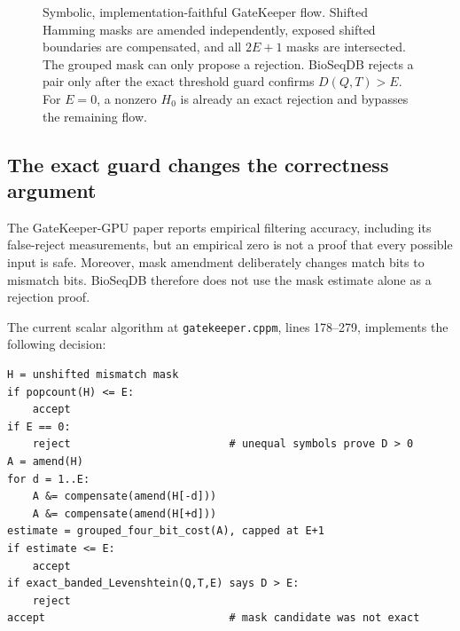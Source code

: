 \begin{figure}[htbp]
\caption{Symbolic, implementation-faithful GateKeeper flow.  Shifted Hamming
masks are amended independently, exposed shifted boundaries are compensated,
and all \(2E+1\) masks are intersected.  The grouped mask can only propose a
rejection.  BioSeqDB rejects a pair only after the exact threshold guard
confirms \(D(Q,T)>E\).  For \(E=0\), a nonzero \(H_0\) is already an exact
rejection and bypasses the remaining flow.}
\label{fig:prefilter-gatekeeper}
\end{figure}

\subsection{The exact guard changes the correctness argument}

The GateKeeper-GPU paper reports empirical filtering accuracy, including its
false-reject measurements, but an empirical zero is not a proof that every
possible input is safe.  Moreover, mask amendment deliberately changes match
bits to mismatch bits.  BioSeqDB therefore does not use the mask estimate alone
as a rejection proof.

The current scalar algorithm at \texttt{gatekeeper.cppm}, lines 178--279,
implements the following decision:

\begin{verbatim}
H = unshifted mismatch mask
if popcount(H) <= E:
    accept
if E == 0:
    reject                         # unequal symbols prove D > 0
A = amend(H)
for d = 1..E:
    A &= compensate(amend(H[-d]))
    A &= compensate(amend(H[+d]))
estimate = grouped_four_bit_cost(A), capped at E+1
if estimate <= E:
    accept
if exact_banded_Levenshtein(Q,T,E) says D > E:
    reject
accept                             # mask candidate was not exact
\end{verbatim}

